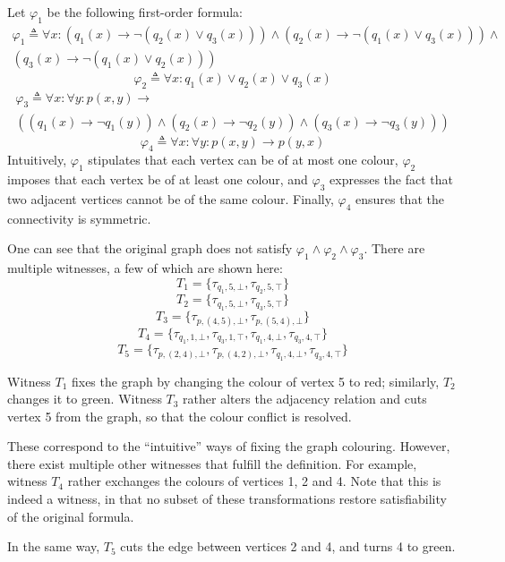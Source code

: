 \begin{example}
Let $\varphi_1$ be the following first-order formula:
\begin{multline*}
\varphi_1 \triangleq \forall x : (q_1(x) \rightarrow \neg(q_2(x) \vee q_3(x))) \wedge (q_2(x) \rightarrow \neg(q_1(x) \vee q_3(x))) \wedge \\
(q_3(x) \rightarrow \neg(q_1(x) \vee q_2(x)))
\end{multline*}
%
\begin{displaymath}
\varphi_2  \triangleq  \forall x : q_1(x) \vee q_2(x) \vee q_3(x)
\end{displaymath}
%
\begin{multline*}
\varphi_3  \triangleq  \forall x : \forall y : p(x,y) \rightarrow\\
((q_1(x) \rightarrow \neg q_1(y)) \wedge (q_2(x) \rightarrow \neg q_2(y)) \wedge (q_3(x) \rightarrow \neg q_3(y)))
\end{multline*}
%
\begin{displaymath}
\varphi_4  \triangleq  \forall x : \forall y : p(x,y) \rightarrow p(y,x)
\end{displaymath}
%
Intuitively, $\varphi_1$ stipulates that each vertex can be of at most one colour, $\varphi_2$ imposes that each vertex be of at least one colour, and $\varphi_3$ expresses the fact that two adjacent vertices cannot be of the same colour. Finally, $\varphi_4$ ensures that the connectivity is symmetric.

One can see that the original graph does not satisfy $\varphi_1 \wedge \varphi_2 \wedge \varphi_3$. There are multiple witnesses, a few of which are shown here:
\[
T_1 = \{\tau_{q_1,5,\bot},\tau_{q_2,5,\top}\}
\]
\[
T_2 = \{\tau_{q_1,5,\bot},\tau_{q_3,5,\top}\}
\]
\[
T_3 = \{\tau_{p,(4,5),\bot},\tau_{p,(5,4),\bot}\}
\]
\[
T_4 = \{\tau_{q_1,1,\bot},\tau_{q_3,1,\top},\tau_{q_1,4,\bot},\tau_{q_3,4,\top}\}
\]
\[
T_5 = \{\tau_{p,(2,4),\bot},\tau_{p,(4,2),\bot},\tau_{q_1,4,\bot},\tau_{q_3,4,\top}\}
\]

Witness $T_1$ fixes the graph by changing the colour of vertex 5 to red; similarly, $T_2$ changes it to green. Witness $T_3$ rather alters the adjacency relation and cuts vertex 5 from the graph, so that the colour conflict is resolved.

These correspond to the ``intuitive'' ways of fixing the graph colouring. However, there exist multiple other witnesses that fulfill the definition. For example, witness $T_4$ rather exchanges the colours of vertices 1, 2 and 4. Note that this is indeed a witness, in that no subset of these transformations restore satisfiability of the original formula.

In the same way, $T_5$ cuts the edge between vertices 2 and 4, and turns 4 to green.
\end{example}

